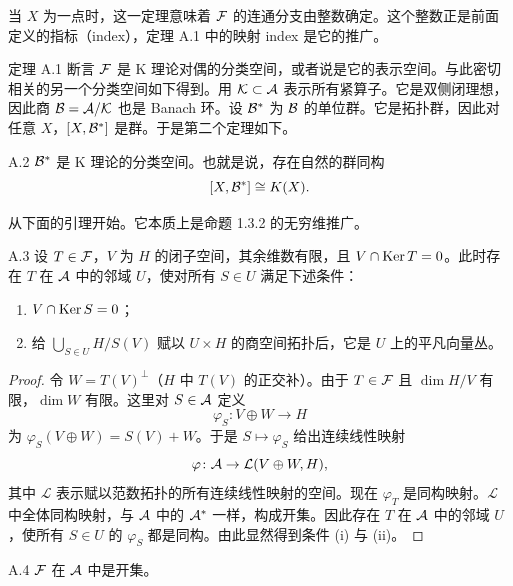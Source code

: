 
 当 $X$ 为一点时，这一定理意味着 $\mathcal{F}$ 的连通分支由整数确定。这个整数正是前面定义的指标（index），定理 A.1 中的映射 index 是它的推广。

定理 A.1 断言 $\mathcal{F}$ 是 K 理论对偶的分类空间，或者说是它的表示空间。与此密切相关的另一个分类空间如下得到。用 $\mathcal{K}\subset\mathcal{A}$ 表示所有紧算子。它是双侧闭理想，因此商 $\mathcal{B}=\mathcal{A}/\mathcal{K}$ 也是 Banach 环。设 $\mathcal{B}^*$ 为 $\mathcal{B}$ 的单位群。它是拓扑群，因此对任意 $X$，$[X,\mathcal{B}^*]$ 是群。于是第二个定理如下。

\begin{theorem*}{A.2}
  $\mathcal{B}^*$ 是 K 理论的分类空间。也就是说，存在自然的群同构
  \[
    [X,\mathcal{B}^*]\cong K(X).
  \]
\end{theorem*}

从下面的引理开始。它本质上是命题 1.3.2 的无穷维推广。
\begin{lemma*}{A.3}
  设 $T\in\mathcal{F}$，$V$ 为 $H$ 的闭子空间，其余维数有限，且 $V\cap\operatorname{Ker} T=0$。此时存在 $T$ 在 $\mathcal{A}$ 中的邻域 $U$，使对所有 $S\in U$ 满足下述条件：
  \begin{enumerate}[label=(\roman*),leftmargin=2.2em,itemsep=1pt,topsep=2pt]
    \item $V\cap\operatorname{Ker} S=0$；
    \item 给 $\bigcup_{S\in U}H/S(V)$ 赋以 $U\times H$ 的商空间拓扑后，它是 $U$ 上的平凡向量丛。
  \end{enumerate}
\end{lemma*}

\begin{proof}
  令 $W=T(V)^\perp$（$H$ 中 $T(V)$ 的正交补）。由于 $T\in\mathcal{F}$ 且 $\dim H/V$ 有限，$\dim W$ 有限。这里对 $S\in\mathcal{A}$ 定义
  \[
    \varphi_S\colon V\oplus W\to H
  \]
  为 $\varphi_S(V\oplus W)=S(V)+W$。于是 $S\mapsto\varphi_S$ 给出连续线性映射
  \[
    \varphi\colon\mathcal{A}\to\mathcal L(V\oplus W,H),
  \]
  其中 $\mathcal L$ 表示赋以范数拓扑的所有连续线性映射的空间。现在 $\varphi_T$ 是同构映射。$\mathcal L$ 中全体同构映射，与 $\mathcal{A}$ 中的 $\mathcal{A}^*$ 一样，构成开集。因此存在 $T$ 在 $\mathcal{A}$ 中的邻域 $U$，使所有 $S\in U$ 的 $\varphi_S$ 都是同构。由此显然得到条件 (i) 与 (ii)。
\end{proof}

\begin{corollary*}{A.4}
  $\mathcal{F}$ 在 $\mathcal{A}$ 中是开集。
\end{corollary*}

